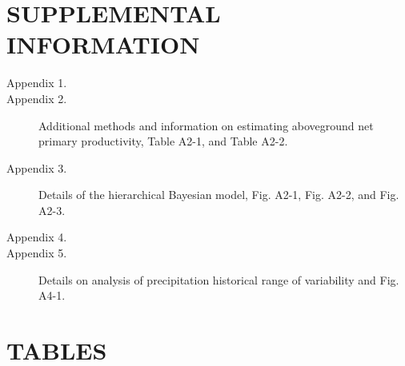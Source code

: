 \documentclass[fleqn,10pt,lineno]{wlpeerj} %
\begin{document}
\section{SUPPLEMENTAL INFORMATION}\label{supplemental-information}

\begin{description}
\item [Appendix 1.] 
\item [Appendix 2.] Additional methods and information on estimating aboveground net primary productivity, Table A2-1, and Table A2-2.
\item [Appendix 3.] Details of the hierarchical Bayesian model, Fig. A2-1, Fig. A2-2, and Fig. A2-3.
\item [Appendix 4.] 
\item [Appendix 5.] Details on analysis of precipitation historical range of variability and Fig. A4-1.
\end{description}

\newpage{}

\section{TABLES}\label{tables}
\end{document}
